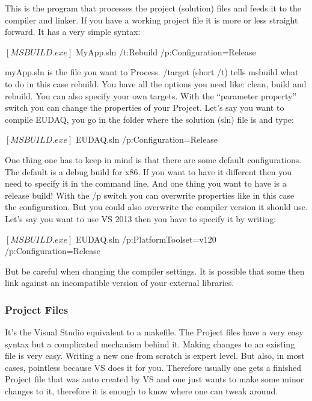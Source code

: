 This is the program that processes the project (solution) files and feeds it to the compiler and linker. If you have a working project file it is more or less straight forward. It has a very simple syntax:

      \begin{listing}[mybash]
$[MSBUILD.exe]$ MyApp.sln /t:Rebuild /p:Configuration=Release
\end{listing}

myApp.sln is the file you want to Process. /target (short /t) tells msbuild what to do in this case rebuild. You have all the options you need like: clean, build and rebuild. You can also specify your own targets. With the “parameter property” switch you can change the properties of your Project. Let’s say you want to compile EUDAQ, you go in the folder where the solution (sln) file is and type:


      \begin{listing}[mybash]
$[MSBUILD.exe]$ EUDAQ.sln /p:Configuration=Release 
\end{listing}


One thing one has to keep in mind is that there are some default configurations. The default is a debug build for x86. If you want to have it different then you need to specify it in the command line. And one thing you want to have is a release build! With the /p switch you can overwrite properties like in this case the configuration. But you could also overwrite the compiler version it should use. Let’s say you want to use VS 2013 then you have to specify it by writing:

      \begin{listing}[mybash]
$[MSBUILD.exe]$ EUDAQ.sln /p:PlatformToolset=v120 /p:Configuration=Release
\end{listing}

But be careful when changing the compiler settings. It is possible that some then link against an incompatible version of your external libraries. 

\subsubsection{Project Files}
It’s the Visual Studio equivalent to a makefile. The Project files have a very easy syntax but a complicated mechanism behind it. Making changes to an existing file is very easy. Writing a new one from scratch is expert level. But also, in most cases, pointless because VS does it for you. Therefore usually one gets a finished Project file that was auto created by VS and one just wants to make some minor changes to it, therefore it is enough to know where one can tweak around. 

